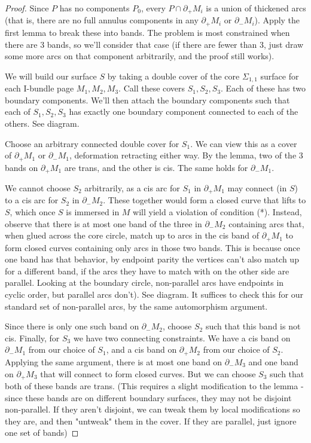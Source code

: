 \documentclass[12pt]{amsart}
\theoremstyle{definition}
\newcommand{\bd}{\partial}
\newcommand{\Si}{\Sigma}
\begin{document}
\begin{proof}

Since $P$ has no components $P_0$, every $P \cap \bd_+M_i$ is a union of thickened
arcs (that is, there are no full annulus components in any $\bd_+M_i$ or $\bd_-M_i$). Apply
the first lemma to break these into bands. The problem is most constrained when
there are 3 bands, so we'll consider that case (if there are fewer than 3, just
draw some more arcs on that component arbitrarily, and the proof still works).

We will build our surface $S$ by taking a double cover of the core $\Si_{1,1}$ surface
for each I-bundle page $M_1,M_2,M_3$. Call these covers $S_1,S_2,S_3$. Each of these has
two boundary components. We'll then attach the boundary components such that
each of $S_1,S_2,S_3$ has exactly one boundary component connected to each of the
others. See diagram.

Choose an arbitrary connected double cover for $S_1$. We can view this as a cover
of $\bd_+M_1$ or $\bd_-M_1$, deformation retracting either way. By the lemma, two of the
3 bands on $\bd_+M_1$ are trans, and the other is cis. The same holds for $\bd_-M_1$.

We cannot choose $S_2$ arbitrarily, as a cis arc for $S_1$ in $\bd_+M_1$ may connect
(in $S$)
to a cis arc for $S_2$ in $\bd_-M_2$. These together would form a closed curve that
lifts to $S$, which once $S$ is immersed in $M$ will yield a violation of condition
(*). Instead, observe that there is at most one band of the three in $\bd_-M_2$
containing arcs that, when glued across the core circle, match up to arcs in
the cis band of $\bd_+M_1$ to form closed curves containing only arcs in those two
bands. This is because once one band has that behavior, by endpoint parity the
vertices can't also match up for a different band, if the arcs they have to
match with on the other side are parallel. Looking at the boundary circle,
non-parallel arcs have endpoints in cyclic order, but parallel arcs don't). See
diagram. It suffices to check this for our standard set of non-parallel arcs,
by the same automorphism argument.

Since there is only one such band on $\bd_-M_2$, choose $S_2$ such that this band is not
cis.  Finally, for $S_3$ we have two connecting constraints. We have a cis band on
$\bd_-M_1$ from our choice of $S_1$, and a cis band on $\bd_+M_2$ from our choice of
$S_2$.
Applying the same argument, there is at most one band on $\bd_-M_3$ and one band on
$\bd_+M_3$ that will connect to form closed curves. But we can choose $S_3$ such that
both of these bands are trans. (This requires a slight modification to the
lemma - since these bands are on different boundary surfaces, they may not be
disjoint non-parallel. If they aren't disjoint, we can tweak them by local
modifications so they are, and then "untweak" them in the cover. If they are
parallel, just ignore one set of bands)


\end{proof}
\end{document}

